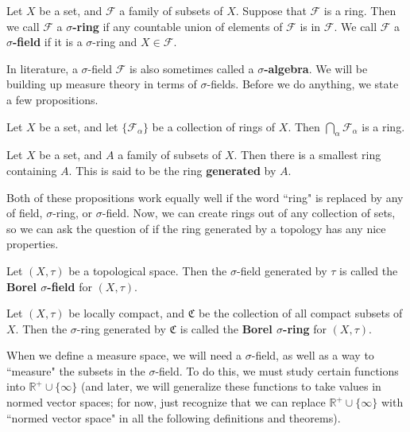	\begin{definition}
		Let $X$ be a set, and $\mathcal F$ a family of subsets of $X$. Suppose that $\mathcal F$ is a ring. Then we call 
		$\mathcal F$ a \textbf{$\sigma$-ring} if any countable union of elements of $\mathcal F$ is in $\mathcal F$. We call 
		$\mathcal F$ a \textbf{$\sigma$-field} if it is a $\sigma$-ring and $X\in\mathcal F$.
	\end{definition}
	
	In literature, a $\sigma$-field $\mathcal F$ is also sometimes called a \textbf{$\sigma$-algebra}. We will be building up 
	measure theory in terms of $\sigma$-fields. Before we do anything, we state a few propositions.
	
	\begin{prop}
		Let $X$ be a set, and let $\{\mathcal F_\alpha\}$ be a collection of rings of $X$. Then $\bigcap_\alpha\mathcal 
		F_\alpha$ is a ring.
	\end{prop}
	
	\begin{prop}
		Let $X$ be a set, and $A$ a family of subsets of $X$. Then there is a smallest ring containing $A$. This is said to be 
		the ring \textbf{generated} by $A$.
	\end{prop}
	
	Both of these propositions work equally well if the word ``ring" is replaced by any of field, $\sigma$-ring, or $\sigma$-field. 
	Now, we can create rings out of any collection of sets, so we can ask the question of if the ring generated by a topology 
	has any nice properties. 
	
	\begin{definition}
		Let $(X, \tau)$ be a topological space. Then the $\sigma$-field generated by $\tau$ is called the \textbf{Borel 
		$\sigma$-field} for $(X, \tau)$. 
	\end{definition}
	
	\begin{definition}
		Let $(X, \tau)$ be locally compact, and $\mathfrak C$ be the collection of all compact subsets of $X$. Then the 
		$\sigma$-ring generated by $\mathfrak C$ is called the \textbf{Borel $\sigma$-ring} for $(X, \tau)$. 
	\end{definition}
	
	When we define a measure space, we will need a $\sigma$-field, as well as a way to ``measure" the subsets in the 
	$\sigma$-field. To do this, we must study certain functions into $\mathbb R^+\cup\{\infty\}$ (and later, we will generalize 
	these functions to take values in normed vector spaces; for now, just recognize that we can replace $\mathbb R^+\cup
	\{\infty\}$ with ``normed vector space" in all the following definitions and theorems). 
	
